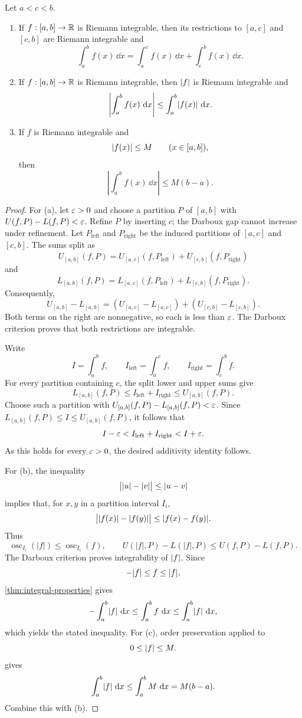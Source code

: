 \begin{theorem}
\label{thm:integral-additivity-absolute}
Let $a<c<b$.
\begin{enumerate}
\item If $f:[a,b]\to\mathbb{R}$ is Riemann integrable, then its restrictions to $[a,c]$ and $[c,b]$ are Riemann integrable and
\[
\int_a^b f(x)\,\dd x
=\int_a^c f(x)\,\dd x+\int_c^b f(x)\,\dd x.
\]
\item If $f:[a,b]\to\mathbb{R}$ is Riemann integrable, then $\lvert f\rvert$ is Riemann integrable and
\[
\left\lvert\int_a^b f(x)\,\mathop{}\!\mathrm{d} x\right\rvert
\leq\int_a^b\lvert f(x)\rvert\,\mathop{}\!\mathrm{d} x.
\]
\item If $f$ is Riemann integrable and
\[
\lvert f(x)\rvert\leq M
\qquad(x\in[a,b]),
\]
then
\[
\left\lvert\int_a^b f(x)\,\dd x\right\rvert\leq M(b-a).
\]
\end{enumerate}
\end{theorem}
\begin{proof}
For (a), let $\varepsilon>0$ and choose a partition $P$ of $[a,b]$ with
$U(f,P)-L(f,P)<\varepsilon$.  Refine $P$ by inserting $c$; the Darboux gap cannot
increase under refinement.  Let $P_{\mathrm{left}}$ and
$P_{\mathrm{right}}$ be the induced partitions of $[a,c]$ and $[c,b]$.
The sums split as
\[
U_{[a,b]}(f,P)=U_{[a,c]}(f,P_{\mathrm{left}})+U_{[c,b]}(f,P_{\mathrm{right}})
\]
and
\[
L_{[a,b]}(f,P)=L_{[a,c]}(f,P_{\mathrm{left}})+L_{[c,b]}(f,P_{\mathrm{right}}).
\]
Consequently,
\[
U_{[a,b]}-L_{[a,b]}
=(U_{[a,c]}-L_{[a,c]})+(U_{[c,b]}-L_{[c,b]}).
\]
Both terms on the right are nonnegative, so each is less than $\varepsilon$.
The Darboux criterion proves that both restrictions are integrable.

Write
\[
I=\int_a^b f,\qquad I_{\mathrm{left}}=\int_a^c f,\qquad
I_{\mathrm{right}}=\int_c^b f.
\]
For every partition containing $c$, the
split lower and upper sums give
\[
L_{[a,b]}(f,P)\leq I_{\mathrm{left}}+I_{\mathrm{right}}
\leq U_{[a,b]}(f,P).
\]
Choose such a partition with $U_{[a,b]}(f,P)-L_{[a,b]}(f,P)<\varepsilon$.  Since
$L_{[a,b]}(f,P)\leq I\leq U_{[a,b]}(f,P)$, it follows that
\[
I-\varepsilon<I_{\mathrm{left}}+I_{\mathrm{right}}<I+\varepsilon.
\]
As this holds for every $\varepsilon>0$, the desired additivity identity follows.

For (b), the inequality
\[
\bigl\lvert\lvert u\rvert-\lvert v\rvert\bigr\rvert\leq\lvert u-v\rvert
\]
implies that, for $x,y$ in a partition interval $I_i$,
\[
\bigl\lvert\lvert f(x)\rvert-\lvert f(y)\rvert\bigr\rvert\leq\lvert f(x)-f(y)\rvert.
\]
Thus
\[
\operatorname{osc}_{I_i}(|f|)\leq\operatorname{osc}_{I_i}(f),
\qquad U(|f|,P)-L(|f|,P)\leq U(f,P)-L(f,P).
\]
The Darboux criterion proves integrability of $\lvert f\rvert$. Since
\[
-\lvert f\rvert\leq f\leq\lvert f\rvert,
\]
\cref{thm:integral-properties} gives
\[
-\int_a^b\lvert f\rvert\,\mathop{}\!\mathrm{d} x\leq\int_a^b f\,\mathop{}\!\mathrm{d} x
\leq\int_a^b\lvert f\rvert\,\mathop{}\!\mathrm{d} x,
\]
which yields the stated inequality.  For (c), order preservation applied to
\[
0\leq\lvert f\rvert\leq M.
\]
gives
\[
\int_a^b\lvert f\rvert\,\mathop{}\!\mathrm{d} x\leq\int_a^b M\,\mathop{}\!\mathrm{d} x=M(b-a).
\]
Combine this with (b).
\end{proof}

